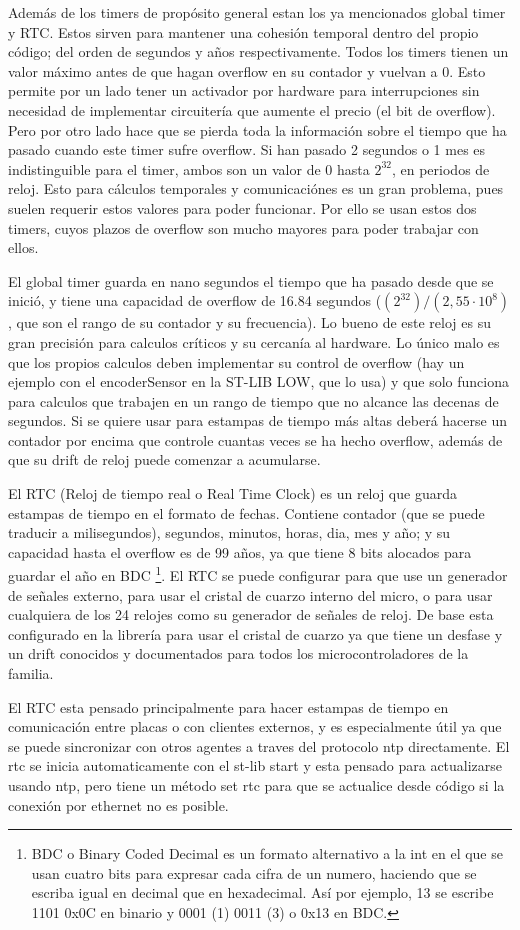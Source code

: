 \documentclass{report}
\begin{document}
Además de los timers de propósito general estan los ya mencionados global timer y RTC. Estos sirven para mantener una cohesión temporal dentro del propio código; del orden de segundos y años respectivamente. Todos los timers tienen un valor máximo antes de que hagan overflow en su contador y vuelvan a 0. Esto permite por un lado tener un activador por hardware para interrupciones sin necesidad de implementar circuitería que aumente el precio (el bit de overflow). Pero por otro lado hace que se pierda toda la información sobre el tiempo que ha pasado cuando este timer sufre overflow. Si han pasado 2 segundos o 1 mes es indistinguible para el timer, ambos son un valor de 0 hasta $2^{32}$, en periodos de reloj. Esto para cálculos temporales y comunicaciónes es un gran problema, pues suelen requerir estos valores para poder funcionar. Por ello se usan estos dos timers, cuyos plazos de overflow son mucho mayores para poder trabajar con ellos. \par 
El global timer guarda en nano segundos el tiempo que ha pasado desde que se inició, y tiene una capacidad de overflow de 16.84 segundos ($(2^{32})/(2,55·10^8)$, que son el rango de su contador y su frecuencia). Lo bueno de este reloj es su gran precisión para calculos críticos y su cercanía al hardware. Lo único malo es que los propios calculos deben implementar su control de overflow (hay un ejemplo con el encoderSensor en la ST-LIB LOW, que lo usa) y que solo funciona para calculos que trabajen en un rango de tiempo que no alcance las decenas de segundos. Si se quiere usar para estampas de tiempo más altas deberá hacerse un contador por encima que controle cuantas veces se ha hecho overflow, además de que su drift de reloj puede comenzar a acumularse. \par \vspace{0.3cm}
El RTC (Reloj de tiempo real o Real Time Clock) es un reloj que guarda estampas de tiempo en el formato de fechas. Contiene contador (que se puede traducir a milisegundos), segundos, minutos, horas, dia, mes y año; y su capacidad hasta el overflow es de 99 años, ya que tiene 8 bits alocados para guardar el año en BDC \footnote{BDC o Binary Coded Decimal es un formato alternativo a la int en el que se usan cuatro bits para expresar cada cifra de un numero, haciendo que se escriba igual en decimal que en hexadecimal. Así por ejemplo, 13 se escribe 1101 0x0C en binario y 0001 (1) 0011 (3) o 0x13 en BDC. }. El RTC se puede configurar para que use un generador de señales externo, para usar el cristal de cuarzo interno del micro, o para usar cualquiera de los 24 relojes como su generador de señales de reloj. De base esta configurado en la librería para usar el cristal de cuarzo ya que tiene un desfase y un drift conocidos y documentados para todos los microcontroladores de la familia. \par 
El RTC esta pensado principalmente para hacer estampas de tiempo en comunicación entre placas o con clientes externos, y es especialmente útil ya que se puede sincronizar con otros agentes a traves del protocolo ntp directamente. El rtc se inicia automaticamente con el st-lib start y esta pensado para actualizarse usando ntp, pero tiene un método set rtc para que se actualice desde código si la conexión por ethernet no es posible.
\end{document}
